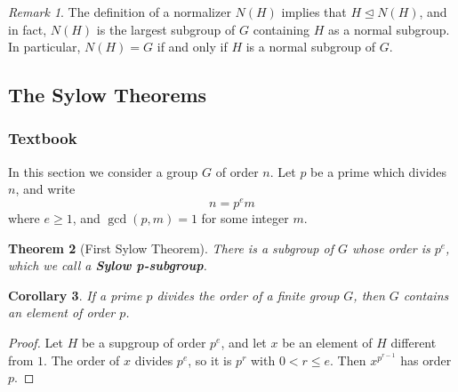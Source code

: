 \documentclass[12pt]{article}
\newtheorem{thm}{Theorem}[section]
\newtheorem{cor}[thm]{Corollary}
\theoremstyle{definition}
\theoremstyle{remark}
\newtheorem{rmk}[thm]{Remark}
\numberwithin{equation}{section}
\newcommand\B[1]{\textbf{ #1}}
\newcommand\nsub{\trianglelefteq}
\begin{document}
\vspace{15pt}

\begin{rmk}
        The definition of a normalizer $N(H)$ implies that $H \nsub N(H)$, and in fact, $N(H)$ is the largest subgroup of $G$ containing $H$ as a normal subgroup. In particular, $N(H) = G$ if and only if $H$ is a normal subgroup of $G$.
\end{rmk}

\vspace{15pt}

\subsection{The Sylow Theorems}


\subsubsection{Textbook}

In this section we consider a group $G$ of order $n$. Let $p$ be a prime which divides $n$, and write \begin{equation}
        n=p^em
\end{equation}
where $e \geq 1$, and $\gcd(p,m) = 1$ for some integer $m$. 

\begin{thm}[First Sylow Theorem]
        There is a subgroup of $G$ whose order is $p^e$, which we call a \B{Sylow p-subgroup}.
\end{thm}

\vspace{15pt}

\begin{cor}
        If a prime $p$ divides the order of a finite group $G$, then $G$ contains an element of order $p$.
\end{cor}
\begin{proof}
        Let $H$ be a supgroup of order $p^e$, and let $x$ be an element of $H$ different from $1$. The order of $x$ divides $p^e$, so it is $p^r$ with $0 < r \leq e$. Then $x^{p^{r-1}}$ has order $p$.
\end{proof}

\vspace{15pt}
\end{document}
